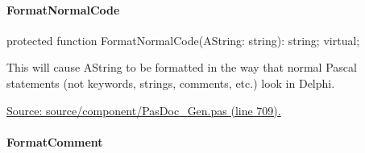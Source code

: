 \documentclass{report}
\newif\ifpdf
\begin{document}
\paragraph*{FormatNormalCode}\hspace*{\fill}

\label{PasDoc_Gen.TDocGenerator-FormatNormalCode}
\begin{list}{}{
\setlength{\itemindent}{0cm}
\setlength{\listparindent}{0cm}
\setlength{\leftmargin}{\evensidemargin}
\addtolength{\leftmargin}{\tmplength}
\settowidth{\labelsep}{X}
\addtolength{\leftmargin}{\labelsep}
\setlength{\labelwidth}{\tmplength}
}
\item[\textbf{Declaration}\hfill]
\ifpdf
\begin{flushleft}
\fi
\begin{ttfamily}
protected function FormatNormalCode(AString: string): string; virtual;\end{ttfamily}

\ifpdf
\end{flushleft}
\fi

\par
\item[\textbf{Description}]
This will cause AString to be formatted in the way that normal Pascal statements (not keywords, strings, comments, etc.) look in Delphi.\par
\href{https://github.com/pasdoc/pasdoc/blob/master/source/component/PasDoc_Gen.pas#L709}{Source: source/component/PasDoc{\_}Gen.pas (line 709).}

\end{list}
\paragraph*{FormatComment}\hspace*{\fill}
\end{document}
